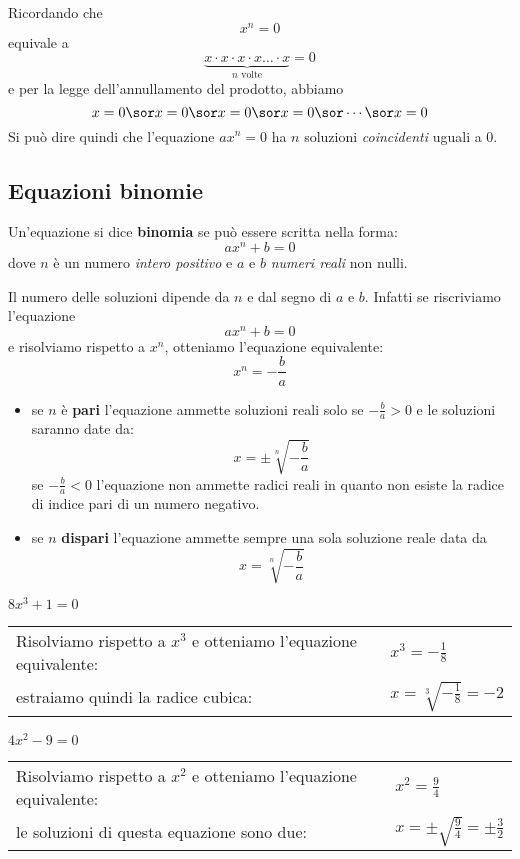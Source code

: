 Ricordando che $$x^n=0$$
equivale a $$\underbrace{x\cdot x\cdot x\cdot x \dots \cdot x}_{\text{$n$ 
volte}}=0$$
e per la legge dell'annullamento del prodotto, abbiamo $$x=0 \sor x=0 
\sor x=0 \sor x=0 \sor \cdots \sor x=0 $$
Si può dire quindi che l'equazione $ax^n=0$ ha $n$ soluzioni 
\emph{coincidenti} uguali a 0.

\subsection{Equazioni binomie}

\begin{definizione}
Un'equazione si dice \textbf{binomia} se può essere scritta nella forma:
$$ax^n+b=0$$
dove $n$ è un numero \emph{intero positivo} e $a$ e $b$  \emph{numeri 
reali}  non nulli.  
\end{definizione}

Il numero delle soluzioni dipende da $n$ e dal segno di $a$ e $b$.
Infatti se riscriviamo l'equazione
$$ax^n+b=0$$
e risolviamo rispetto a $x^n$, otteniamo l'equazione equivalente:
$$x^n=-\frac{b}{a}$$

\begin{itemize}
\item se $n$ è \textbf{pari} l'equazione ammette soluzioni reali 
solo se  $-\frac{b}{a}>0$ e le soluzioni saranno date da:
$$x=\pm \sqrt[n]{-\frac{b}{a}}$$
se $-\frac{b}{a}<0$ l'equazione non ammette radici reali in 
quanto non esiste la radice di indice pari di un numero negativo.
\item se $n$ \textbf{dispari} l'equazione ammette sempre 
una sola soluzione reale data da  $$x= \sqrt[n]{-\frac{b}{a}}$$ 
\end{itemize}

\begin{esempio}
$8x^3+1=0$
\begin{center}
\begin{tabular}{ll}
Risolviamo rispetto a $x^3$ e otteniamo l'equazione equivalente: & 
$x^3=-\frac{1}{8}$\\
estraiamo quindi la radice cubica: & $x=\sqrt[3]{-\frac{1}{8}} = -2$
\end{tabular}
\end{center}
\end{esempio}

\begin{esempio}
$4x^2-9=0$
\begin{center}
\begin{tabular}{ll}
Risolviamo rispetto a $x^2$ e otteniamo l'equazione equivalente: & 
$x^2=\frac{9}{4}$\\
le soluzioni di questa equazione sono due: & 
$x=\pm \sqrt{\frac{9}{4}}=\pm\frac{3}{2}$
\end{tabular}
\end{center}
\end{esempio}    

